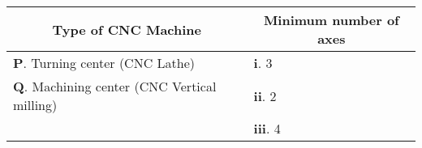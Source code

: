 \begin{center}
\begin{tabular}{|l|l|}
\hline
\multicolumn{1}{|c|}{Type of CNC Machine} & \multicolumn{1}{|c|}{Minimum number of axes} \\
\hline
\textbf{P}. Turning center (CNC Lathe) & \textbf{i}. 3 \\
\hline
\textbf{Q}. Machining center (CNC Vertical milling) & \textbf{ii}. 2 \\
\hline
 & \textbf{iii}. 4 \\
\hline
\end{tabular}
\end{center}
